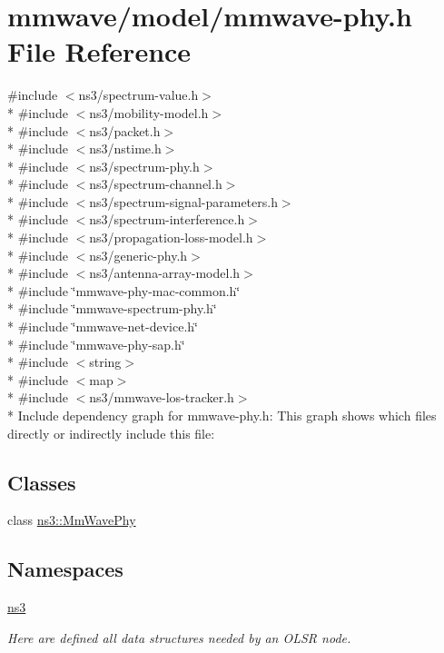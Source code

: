 \hypertarget{mmwave-phy_8h}{}\section{mmwave/model/mmwave-\/phy.h File Reference}
\label{mmwave-phy_8h}
{\ttfamily \#include $<$ns3/spectrum-\/value.\+h$>$}\\*
{\ttfamily \#include $<$ns3/mobility-\/model.\+h$>$}\\*
{\ttfamily \#include $<$ns3/packet.\+h$>$}\\*
{\ttfamily \#include $<$ns3/nstime.\+h$>$}\\*
{\ttfamily \#include $<$ns3/spectrum-\/phy.\+h$>$}\\*
{\ttfamily \#include $<$ns3/spectrum-\/channel.\+h$>$}\\*
{\ttfamily \#include $<$ns3/spectrum-\/signal-\/parameters.\+h$>$}\\*
{\ttfamily \#include $<$ns3/spectrum-\/interference.\+h$>$}\\*
{\ttfamily \#include $<$ns3/propagation-\/loss-\/model.\+h$>$}\\*
{\ttfamily \#include $<$ns3/generic-\/phy.\+h$>$}\\*
{\ttfamily \#include $<$ns3/antenna-\/array-\/model.\+h$>$}\\*
{\ttfamily \#include \char`\"{}mmwave-\/phy-\/mac-\/common.\+h\char`\"{}}\\*
{\ttfamily \#include \char`\"{}mmwave-\/spectrum-\/phy.\+h\char`\"{}}\\*
{\ttfamily \#include \char`\"{}mmwave-\/net-\/device.\+h\char`\"{}}\\*
{\ttfamily \#include \char`\"{}mmwave-\/phy-\/sap.\+h\char`\"{}}\\*
{\ttfamily \#include $<$string$>$}\\*
{\ttfamily \#include $<$map$>$}\\*
{\ttfamily \#include $<$ns3/mmwave-\/los-\/tracker.\+h$>$}\\*
Include dependency graph for mmwave-\/phy.h\+:
This graph shows which files directly or indirectly include this file\+:
\subsection*{Classes}
\begin{DoxyCompactItemize}
\item 
class \hyperlink{classns3_1_1MmWavePhy}{ns3\+::\+Mm\+Wave\+Phy}
\end{DoxyCompactItemize}
\subsection*{Namespaces}
\begin{DoxyCompactItemize}
\item 
 \hyperlink{namespacens3}{ns3}
\begin{DoxyCompactList}\small\item\em Here are defined all data structures needed by an O\+L\+SR node. \end{DoxyCompactList}\end{DoxyCompactItemize}
